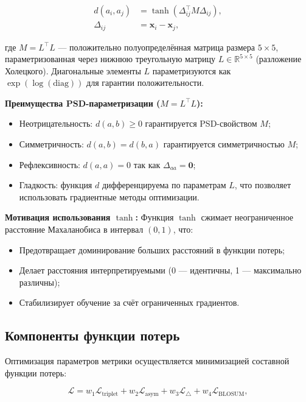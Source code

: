 \documentclass[12pt]{article}
\begin{document}
\begin{align}
d(a_i, a_j) &= \tanh\left(\Delta_{ij}^{\top} M \Delta_{ij}\right), \\
\Delta_{ij} &= \mathbf{x}_i - \mathbf{x}_j,
\end{align}

где $M = L^{\top}L$ --- положительно полуопределённая матрица размера $5 \times 5$, параметризованная через нижнюю треугольную матрицу $L \in \mathbb{R}^{5 \times 5}$ (разложение Холецкого). Диагональные элементы $L$ параметризуются как $\exp(\log(\text{diag}))$ для гарантии положительности.

\textbf{Преимущества PSD-параметризации ($M = L^{\top}L$):}
\begin{itemize}
    \item Неотрицательность: $d(a,b) \ge 0$ гарантируется PSD-свойством $M$;
    \item Симметричность: $d(a,b) = d(b,a)$ гарантируется симметричностью $M$;
    \item Рефлексивность: $d(a,a) = 0$ так как $\Delta_{aa} = \mathbf{0}$;
    \item Гладкость: функция $d$ дифференцируема по параметрам $L$, что позволяет использовать градиентные методы оптимизации.
\end{itemize}

\textbf{Мотивация использования $\tanh$:}
Функция $\tanh$ сжимает неограниченное расстояние Махаланобиса в интервал $(0, 1)$, что:
\begin{itemize}
    \item Предотвращает доминирование больших расстояний в функции потерь;
    \item Делает расстояния интерпретируемыми (0 --- идентичны, 1 --- максимально различны);
    \item Стабилизирует обучение за счёт ограниченных градиентов.
\end{itemize}

\subsection{Компоненты функции потерь}

Оптимизация параметров метрики осуществляется минимизацией составной функции потерь:

\begin{equation}
\mathcal{L} = w_1 \mathcal{L}_{\text{triplet}} + w_2 \mathcal{L}_{\text{asym}} + w_3 \mathcal{L}_{\triangle} + w_4 \mathcal{L}_{\text{BLOSUM}},
\label{eq:loss_total}
\end{equation}
\end{document}
